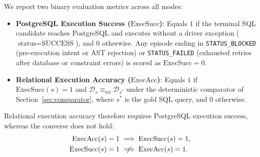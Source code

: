 We report two binary evaluation metrics across all modes:
\begin{itemize}
\item \textbf{PostgreSQL Execution Success ($\text{ExecSucc}$)}: Equals $1$ if the terminal SQL candidate reaches PostgreSQL and executes without a driver exception ($\text{status} = \text{SUCCESS}$), and $0$ otherwise. Any episode ending in \texttt{STATUS\_BLOCKED} (pre-execution intent or AST rejection) or \texttt{STATUS\_FAILED} (exhausted retries after database or constraint errors) is scored as $\text{ExecSucc} = 0$.
\item \textbf{Relational Execution Accuracy ($\text{ExecAcc}$)}: Equals $1$ if $\text{ExecSucc}(s) = 1$ and $\mathcal{D}_s \equiv_{\text{rel}} \mathcal{D}_{s^*}$ under the deterministic comparator of Section~\ref{sec:comparator}, where $s^*$ is the gold SQL query, and $0$ otherwise.
\end{itemize}
Relational execution accuracy therefore requires PostgreSQL execution success, whereas the converse does not hold:
\begin{equation}
\begin{aligned}
\text{ExecAcc}(s) = 1 &\implies \text{ExecSucc}(s) = 1, \\
\text{ExecSucc}(s) = 1 &\centernot\implies \text{ExecAcc}(s) = 1.
\end{aligned}
\end{equation}


